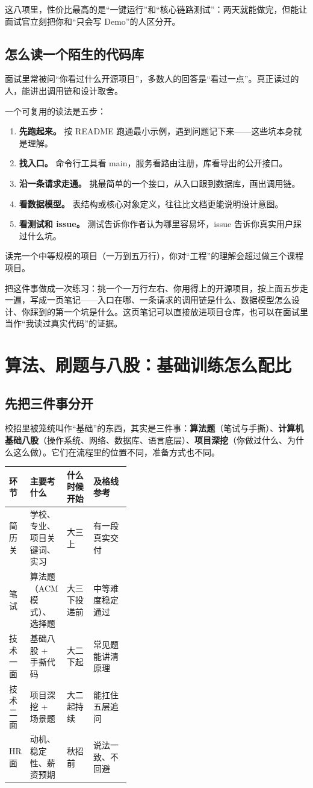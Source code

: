 \documentclass[UTF8,zihao=5,openany]{ctexbook}
\begin{document}
这八项里，性价比最高的是“一键运行”和“核心链路测试”：两天就能做完，但能让面试官立刻把你和“只会写 Demo”的人区分开。

\section{怎么读一个陌生的代码库}
面试里常被问“你看过什么开源项目”，多数人的回答是“看过一点”。真正读过的人，能讲出调用链和设计取舍。

一个可复用的读法是五步：

\begin{enumerate}
\item \textbf{先跑起来。} 按 README 跑通最小示例，遇到问题记下来——这些坑本身就是理解。
\item \textbf{找入口。} 命令行工具看 main，服务看路由注册，库看导出的公开接口。
\item \textbf{沿一条请求走通。} 挑最简单的一个接口，从入口跟到数据库，画出调用链。
\item \textbf{看数据模型。} 表结构或核心对象定义，往往比文档更能说明设计意图。
\item \textbf{看测试和 issue。} 测试告诉你作者认为哪里容易坏，issue 告诉你真实用户踩过什么坑。
\end{enumerate}

读完一个中等规模的项目（一万到五万行），你对“工程”的理解会超过做三个课程项目。

把这件事做成一次练习：挑一个一万行左右、你用得上的开源项目，按上面五步走一遍，写成一页笔记——入口在哪、一条请求的调用链是什么、数据模型怎么设计、你踩到的第一个坑是什么。这页笔记可以直接放进项目仓库，也可以在面试里当作“我读过真实代码”的证据。


\chapter{算法、刷题与八股：基础训练怎么配比}
\section{先把三件事分开}
校招里被笼统叫作“基础”的东西，其实是三件事：\textbf{算法题}（笔试与手撕）、\textbf{计算机基础八股}（操作系统、网络、数据库、语言底层）、\textbf{项目深挖}（你做过什么、为什么这么做）。它们在流程里的位置不同，准备方式也不同。

\begin{center}\small
\begin{tabularx}{\linewidth}{p{0.16\linewidth}p{0.24\linewidth}YY}
\toprule
环节 & 主要考什么 & 什么时候开始 & 及格线参考 \\
\midrule
简历关 & 学校、专业、项目关键词、实习 & 大三上 & 有一段真实交付 \\
笔试 & 算法题（ACM 模式）、选择题 & 大三下投递前 & 中等难度稳定通过 \\
技术一面 & 基础八股 + 手撕代码 & 大二下起 & 常见题能讲清原理 \\
技术二面 & 项目深挖 + 场景题 & 大二起持续 & 能扛住五层追问 \\
HR 面 & 动机、稳定性、薪资预期 & 秋招前 & 说法一致、不回避 \\
\bottomrule
\end{tabularx}
\end{center}
\end{document}

